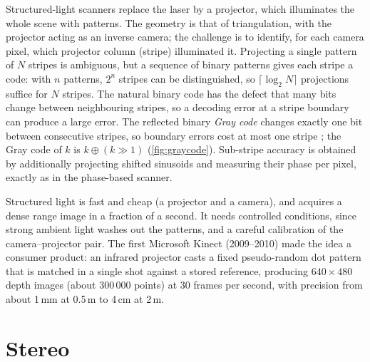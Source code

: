Structured-light scanners replace the laser by a projector, which illuminates the whole scene with
patterns. The geometry is that of triangulation, with the projector acting as an inverse camera;
the challenge is to identify, for each camera pixel, which projector column (stripe) illuminated it.
Projecting a single pattern of $N$ stripes is ambiguous, but a sequence of binary patterns gives
each stripe a code: with $n$ patterns, $2^n$ stripes can be distinguished, so
$\lceil\log_2N\rceil$ projections suffice for $N$ stripes. The natural binary code has the defect
that many bits change between neighbouring stripes, so a decoding error at a stripe boundary can
produce a large error. The reflected binary \emph{Gray code} changes exactly one bit between
consecutive stripes, so boundary errors cost at most one stripe \citep{Inokuchi1984}; the Gray
code of $k$ is $k\oplus(k\gg1)$ (\cref{fig:graycode}). Sub-stripe accuracy is obtained by
additionally projecting shifted sinusoids and measuring their phase per pixel, exactly as in the
phase-based scanner.


Structured light is fast and cheap (a projector and a camera), and acquires a dense range image
in a fraction of a second. It needs controlled conditions, since strong ambient light washes out
the patterns, and a careful calibration of the camera--projector pair. The first Microsoft
Kinect (2009--2010) made the idea a consumer product: an infrared projector casts a fixed
pseudo-random dot pattern that is matched in a single shot against a stored reference, producing
$640\times480$ depth images (about $300\,000$ points) at 30 frames per second, with precision from
about 1\,mm at 0.5\,m to 4\,cm at 2\,m.

\section{Stereo}


